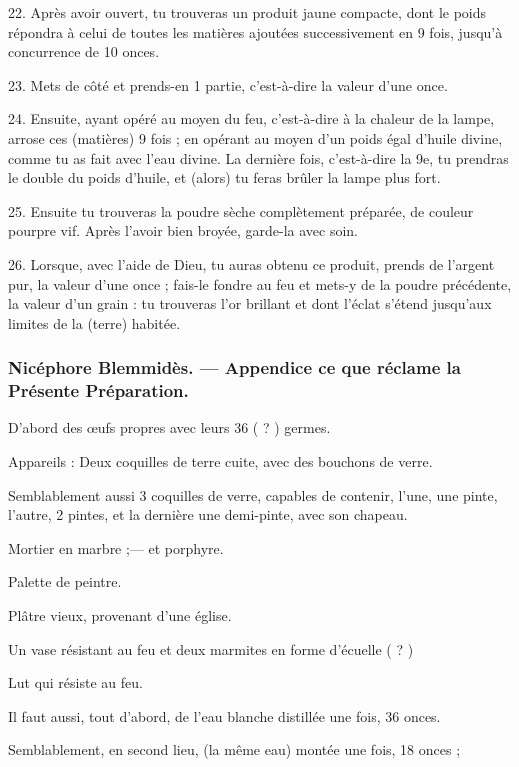\documentclass[a4paper, 11pt, oneside, polutonikogreek, french]{article}
\begin{document}
22. Après avoir ouvert, tu trouveras un produit jaune compacte, dont le poids répondra à celui de toutes les matières ajoutées successivement en 9 fois, jusqu'à concurrence de 10 onces.

23. Mets de côté et prends-en 1 partie, c'est-à-dire la valeur d'une once.

24. Ensuite, ayant opéré au moyen du feu, c'est-à-dire à la chaleur de la lampe, arrose ces (matières) 9 fois ; en opérant au moyen d'un poids égal d'huile divine, comme tu as fait avec l'eau divine. La dernière fois, c'est-à-dire la 9e, tu prendras le double du poids d'huile, et (alors) tu feras brûler la lampe plus fort.

25. Ensuite tu trouveras la poudre sèche complètement préparée, de couleur pourpre vif. Après l'avoir bien broyée, garde-la avec soin.

26. Lorsque, avec l'aide de Dieu, tu auras obtenu ce produit, prends de l'argent pur, la valeur d'une once ; fais-le fondre au feu et mets-y de la poudre précédente, la valeur d'un grain : tu trouveras l'or brillant et dont l'éclat s'étend jusqu'aux limites de la (terre) habitée.

\bigskip
\centerline{\EightStarTaper}
\centerline{\EightStarTaper\EightStarTaper}
\bigskip

\subsubsection{Nicéphore Blemmidès. --- Appendice ce que réclame la Présente Préparation.}

D'abord des œufs propres avec leurs 36 ( ? ) germes.

Appareils : Deux coquilles de terre cuite, avec des bouchons de verre.

Semblablement aussi 3 coquilles de verre, capables de contenir, l'une, une pinte, l'autre, 2 pintes, et la dernière une demi-pinte, avec son chapeau.

Mortier en marbre ;--- et porphyre.

Palette de peintre.

Plâtre vieux, provenant d'une église.

Un vase résistant au feu et deux marmites en forme d'écuelle ( ? )

Lut qui résiste au feu.

Il faut aussi, tout d'abord, de l'eau blanche distillée une fois, 36 onces.

Semblablement, en second lieu, (la même eau) montée une fois, 18 onces ;
\end{document}
